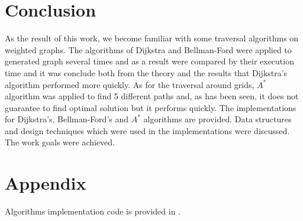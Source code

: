 \documentclass[12pt, bachelor, substylefile = algo_title.rtx]{disser}
\theoremstyle{definition}
\begin{document}


\section{Conclusion}
As the result of this work, we become familiar with some traversal algorithms on weighted graphs. The algorithms of Dijkstra and Bellman-Ford were applied to generated graph several times and as a result were compared by their execution time and it was conclude both from the theory and the results that Dijkstra's algorithm performed more quickly. As for the traversal around grids, $A^*$ algorithm was applied to find 5 different paths and, as has been seen, it does not guarantee to find optimal solution but it performs quickly. The implementations for Dijkstra's, Bellman-Ford's and $A^*$ algorithms are provided. Data structures and design techniques which were used in the implementations were discussed. The work goals were achieved.

\section{Appendix}
Algorithms implementation code is provided in \cite{repogithub}.

{\small }

\end{document}
